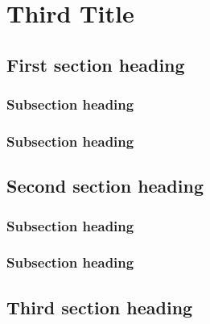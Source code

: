 \chapter[\DTMusedate{entry}]{Third Title}

\section{First section heading}
\lipsum[1]

\subsection{Subsection heading}
\lipsum[1-2]

\subsection{Subsection heading}
\lipsum[1-2]

\section{Second section heading}
\lipsum[3-5]

\subsection{Subsection heading}
\lipsum[1-2]

\subsection{Subsection heading}
\lipsum[1-2]

\section{Third section heading}
\lipsum[1]
